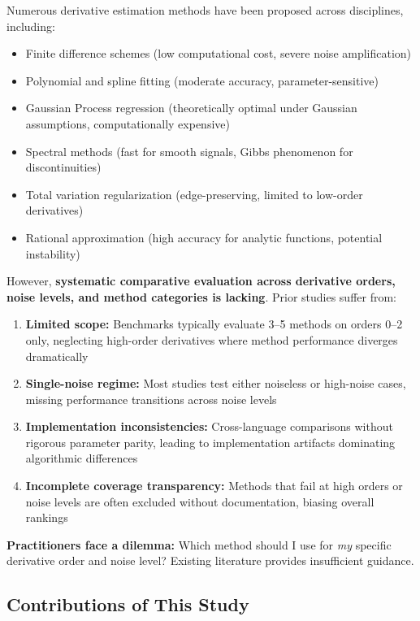 Numerous derivative estimation methods have been proposed across disciplines, including:
\begin{itemize}
    \item Finite difference schemes (low computational cost, severe noise amplification)
    \item Polynomial and spline fitting (moderate accuracy, parameter-sensitive)
    \item Gaussian Process regression (theoretically optimal under Gaussian assumptions, computationally expensive)
    \item Spectral methods (fast for smooth signals, Gibbs phenomenon for discontinuities)
    \item Total variation regularization (edge-preserving, limited to low-order derivatives)
    \item Rational approximation (high accuracy for analytic functions, potential instability)
\end{itemize}

However, \textbf{systematic comparative evaluation across derivative orders, noise levels, and method categories is lacking}. Prior studies suffer from:

\begin{enumerate}
    \item \textbf{Limited scope:} Benchmarks typically evaluate 3--5 methods on orders 0--2 only, neglecting high-order derivatives where method performance diverges dramatically
    \item \textbf{Single-noise regime:} Most studies test either noiseless or high-noise cases, missing performance transitions across noise levels
    \item \textbf{Implementation inconsistencies:} Cross-language comparisons without rigorous parameter parity, leading to implementation artifacts dominating algorithmic differences
    \item \textbf{Incomplete coverage transparency:} Methods that fail at high orders or noise levels are often excluded without documentation, biasing overall rankings
\end{enumerate}

\textbf{Practitioners face a dilemma:} Which method should I use for \textit{my} specific derivative order and noise level? Existing literature provides insufficient guidance.

\subsection{Contributions of This Study}
\label{sec:contributions}

